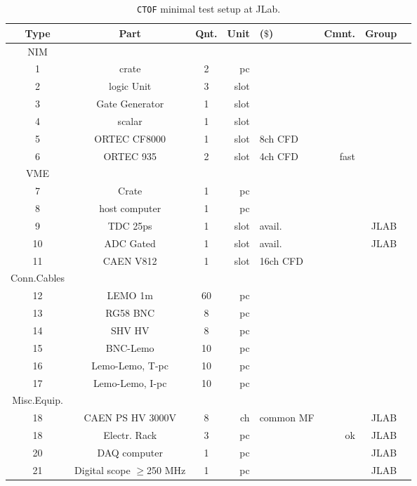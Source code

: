 \documentclass[12pt]{article}
\begin{document}
\begin{table}[htbp]
\begin{center}
\begin{tabular}{|c|c|c|r|l|r|r|r|} \hline
 Type  & Part                & Qnt.& Unit  & ($\$$)  & Cmnt. & Group\\ \hline
NIM \\ \hline
1      &  crate              &  2  & pc    &         &       &\\ \hline
2      &  logic Unit         &  3  & slot  &         &       &\\ \hline
3      &  Gate Generator     &  1  & slot  &         &       &\\ \hline
4      &  scalar             &  1  & slot  &         &       &\\ \hline
5      &  ORTEC  CF8000      &  1  & slot  & 8ch CFD &       &\\ \hline 
6      &  ORTEC  935         &  2  & slot  & 4ch CFD &fast   &\\ \hline
VME \\  \hline
7      &  Crate              &  1  & pc    &         &       &\\ \hline
8      &  host computer      &  1  & pc    &         &       &\\ \hline
9      &  TDC  25ps          &  1  & slot  & avail.  &       &JLAB\\ \hline
10     &  ADC  Gated         &  1  & slot  & avail.  &       &JLAB\\ \hline
11     &  CAEN V812          &  1  & slot  & 16ch CFD&       &\\ \hline
Conn.Cables\\  \hline
12     &  LEMO  1m           & 60  & pc    &         &       &\\ \hline
13     &  RG58  BNC          &  8  & pc    &         &       &\\ \hline
14     &  SHV HV             &  8  & pc    &         &       &\\ \hline
15     &  BNC-Lemo           & 10  & pc    &         &       &\\ \hline
16     &  Lemo-Lemo, T-pc    & 10  & pc    &         &       &\\ \hline
17     &  Lemo-Lemo, I-pc    & 10  & pc    &         &       &\\ \hline 
Misc.Equip.\\ \hline
18     & CAEN PS HV 3000V    &  8  & ch    & common MF &       &JLAB\\ \hline
18     &Electr. Rack         &  3  & pc    &         & ok    &JLAB\\ \hline 
20     &DAQ computer         &  1  & pc    &         &       &JLAB\\ \hline
21     &Digital scope $\ge$250 MHz&  1  & pc    &         &       &JLAB \\ \hline
\end{tabular}
\end{center}
\caption{{\tt CTOF} minimal test setup at JLab.}
\label{table6}
\end{table}
\end{document}

